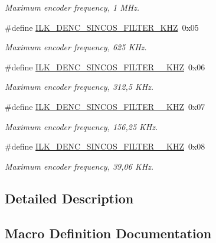 \begin{DoxyCompactItemize}
\begin{DoxyCompactList}\small\item\em Maximum encoder frequency, 1 M\+Hz. \end{DoxyCompactList}\item 
\#define \hyperlink{group__IL__CONST__DENC__SINCOS__PARAM_ga0f785aa2d5b11e4d656f2ea19cb6a926}{I\+L\+K\+\_\+\+D\+E\+N\+C\+\_\+\+S\+I\+N\+C\+O\+S\+\_\+\+F\+I\+L\+T\+E\+R\+\_\+K\+HZ}~0x05
\begin{DoxyCompactList}\small\item\em Maximum encoder frequency, 625 K\+Hz. \end{DoxyCompactList}\item 
\#define \hyperlink{group__IL__CONST__DENC__SINCOS__PARAM_gabf0b203f9902719cc22e4ec133ab8b13}{I\+L\+K\+\_\+\+D\+E\+N\+C\+\_\+\+S\+I\+N\+C\+O\+S\+\_\+\+F\+I\+L\+T\+E\+R\+\_\+\_\+K\+HZ}~0x06
\begin{DoxyCompactList}\small\item\em Maximum encoder frequency, 312,5 K\+Hz. \end{DoxyCompactList}\item 
\#define \hyperlink{group__IL__CONST__DENC__SINCOS__PARAM_ga2821c6dfcb9c57af1d255d81e6b0f4a9}{I\+L\+K\+\_\+\+D\+E\+N\+C\+\_\+\+S\+I\+N\+C\+O\+S\+\_\+\+F\+I\+L\+T\+E\+R\+\_\+\_\+K\+HZ}~0x07
\begin{DoxyCompactList}\small\item\em Maximum encoder frequency, 156,25 K\+Hz. \end{DoxyCompactList}\item 
\#define \hyperlink{group__IL__CONST__DENC__SINCOS__PARAM_ga1d917241b2d4351fb37663abf9e65ef7}{I\+L\+K\+\_\+\+D\+E\+N\+C\+\_\+\+S\+I\+N\+C\+O\+S\+\_\+\+F\+I\+L\+T\+E\+R\+\_\+\_\+K\+HZ}~0x08
\begin{DoxyCompactList}\small\item\em Maximum encoder frequency, 39,06 K\+Hz. \end{DoxyCompactList}\end{DoxyCompactItemize}


\subsection{Detailed Description}


\subsection{Macro Definition Documentation}
